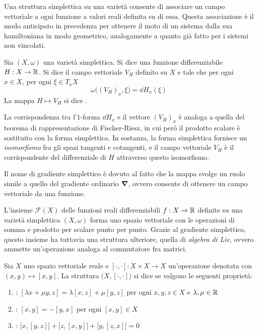 Una struttura simplettica su una varietà consente di associare un campo vettoriale a ogni funzione a valori reali definita su di essa. Questa associazione è il modo anticipato in precedenza per ottenere il moto di un sistema dalla sua hamiltoniana in modo geometrico, analogamente a quanto già fatto per i sistemi non vincolati.
\begin{definition} \label{def:hamField}
  Sia $(X, \omega)$ una varietà simplettica. Si dice  una funzione differenziabile $H: X \to \mathbb{R}$. Si dice  il campo vettoriale $V_H$ definito su $X$ e tale che per ogni $x \in X$, per ogni $\xi \in T_x X$
  \begin{equation} \label{eq:hamField}
    \omega\big((V_H)_x, \xi\big) = \dd{H}_x(\xi)
  \end{equation}
  La mappa $H \mapsto V_H$ si dice .
\end{definition}
\begin{remark}
  La corrispondenza tra l'$1$-forma $\dd{H}_x$ e il vettore $(V_H)_x$ è analoga a quella del teorema di rappresentazione di Fischer-Riesz, in cui però il prodotto scalare è sostituito con la forma simplettica. In sostanza, la forma simplettica fornisce un \emph{isomorfismo} fra gli spazi tangenti e cotangenti, e il campo vettoriale $V_H$ è il corrispondente del differenziale di $H$ attraverso questo isomorfismo.
\end{remark}
\begin{remark}
  Il nome di gradiente simplettico è dovuto al fatto che la mappa svolge un ruolo simile a quello del gradiente ordinario $\grad$, ovvero consente di ottenere un campo vettoriale da una funzione.
\end{remark}

L'insieme $\mathcal{F}(X)$ delle funzioni reali differenziabili $f:X \to \mathbb{R}$ definite su una varietà simplettica $(X, \omega)$ forma uno spazio vettoriale con le operazioni di somma e prodotto per scalare punto per punto. Grazie al gradiente simplettico, questo insieme ha tuttavia una struttura ulteriore, quella di \emph{algebra di Lie}, ovvero ammette un'operazione analoga al commutatore fra matrici.
\begin{definition}
  Sia $X$ uno spazio vettoriale reale e $[\cdot , \cdot]:X \times X \to X$ un'operazione denotata con $(x,y) \mapsto [x,y]$. La struttura $\big(X, [\cdot ,\cdot ]\big)$ si dice  se valgono le seguenti proprietà: \begin{enumerate}
    \item {}: $[\lambda x + \mu y, z] = \lambda [x, z] + \mu[y,z]$ per ogni $x,y,z \in X$ e $\lambda, \mu \in  \mathbb{R}$
    \item {}: $[x,y] = -[y,x]$ per ogni $[x,y] \in X$
    \item {}: $\big[x,[y,z]\big] + \big[z,[x,y]\big] + \big[y,[z,x]\big] = 0$
  \end{enumerate}
\end{definition}

